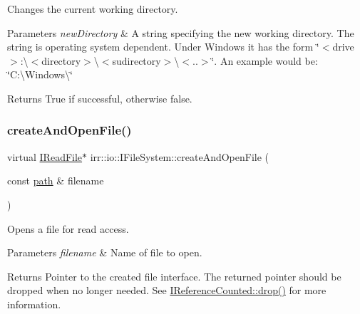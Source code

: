 Changes the current working directory. 


\begin{DoxyParams}{Parameters}
{\em new\+Directory} & A string specifying the new working directory. The string is operating system dependent. Under Windows it has the form \char`\"{}$<$drive$>$\+:\textbackslash{}$<$directory$>$\textbackslash{}$<$sudirectory$>$\textbackslash{}$<$..$>$\char`\"{}. An example would be\+: \char`\"{}\+C\+:\textbackslash{}\+Windows\textbackslash{}\char`\"{} \\
\hline
\end{DoxyParams}
\begin{DoxyReturn}{Returns}
True if successful, otherwise false. 
\end{DoxyReturn}
\mbox{\label{classirr_1_1io_1_1IFileSystem_a3678bb77e12cc6ee2b3947f4c79f6c90}} 
\subsubsection{\texorpdfstring{create\+And\+Open\+File()}{createAndOpenFile()}}
{\footnotesize\ttfamily virtual \hyperlink{classirr_1_1io_1_1IReadFile}{I\+Read\+File}$\ast$ irr\+::io\+::\+I\+File\+System\+::create\+And\+Open\+File (\begin{DoxyParamCaption}\item[{const \hyperlink{namespaceirr_1_1io_ab1bdc45edb3f94d8319c02bc0f840ee1}{path} \&}]{filename }\end{DoxyParamCaption})\hspace{0.3cm}{\ttfamily [pure virtual]}}



Opens a file for read access. 


\begin{DoxyParams}{Parameters}
{\em filename} & Name of file to open. \\
\hline
\end{DoxyParams}
\begin{DoxyReturn}{Returns}
Pointer to the created file interface. The returned pointer should be dropped when no longer needed. See \hyperlink{classirr_1_1IReferenceCounted_a03856a09355b89d178090c4a5f738543}{I\+Reference\+Counted\+::drop()} for more information. 
\end{DoxyReturn}
\mbox{\label{classirr_1_1io_1_1IFileSystem_af0ed28b697936ee8aa60a5a0877ac90a}} 
